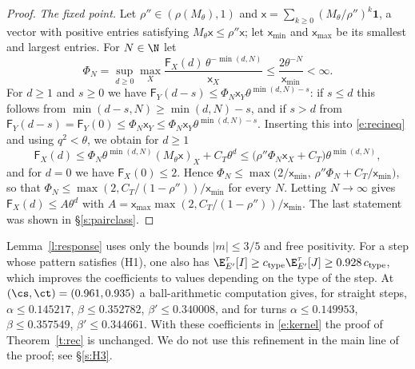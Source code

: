 \begin{proof}
\emph{The fixed point.} Let $\rho'' \in (\rho(M_\theta), 1)$ and $\mathsf x = \sum_{k \ge 0} (M_\theta/\rho'')^k \mathbf 1$, a vector with positive entries satisfying $M_\theta \mathsf x \le \rho'' \mathsf x$; let $\mathsf x_{\min}$ and $\mathsf x_{\max}$ be its smallest and largest entries. For $N \in \N$ let
\begin{equation*}
\Phi_N = \sup_{d \ge 0} \max_{X} \frac{\mathsf F_X(d) \, \theta^{-\min(d, N)}}{\mathsf x_X} \le \frac{2 \theta^{-N}}{\mathsf x_{\min}} < \infty .
\end{equation*}
For $d \ge 1$ and $s \ge 0$ we have $\mathsf F_Y(d - s) \le \Phi_N \mathsf x_Y \theta^{\min(d, N) - s}$: if $s \le d$ this follows from $\min(d - s, N) \ge \min(d, N) - s$, and if $s > d$ from $\mathsf F_Y(d - s) = \mathsf F_Y(0) \le \Phi_N \mathsf x_Y \le \Phi_N \mathsf x_Y \theta^{\min(d, N) - s}$. Inserting this into \eqref{e:recineq} and using $q^2 < \theta$, we obtain for $d \ge 1$
\begin{equation*}
\mathsf F_X(d) \le \Phi_N \theta^{\min(d, N)} (M_\theta \mathsf x)_X + C_T \theta^{d} \le \bigl( \rho'' \Phi_N \mathsf x_X + C_T \bigr) \theta^{\min(d, N)} ,
\end{equation*}
and for $d = 0$ we have $\mathsf F_X(0) \le 2$. Hence $\Phi_N \le \max\bigl( 2/\mathsf x_{\min}, \, \rho'' \Phi_N + C_T / \mathsf x_{\min} \bigr)$, so that $\Phi_N \le \max(2, C_T/(1 - \rho''))/\mathsf x_{\min}$ for every $N$. Letting $N \to \infty$ gives $\mathsf F_X(d) \le A \theta^d$ with $A = \mathsf x_{\max} \max(2, C_T / (1 - \rho''))/\mathsf x_{\min}$. The last statement was shown in \S\ref{s:pairclass}.
\end{proof}

\begin{remark}\label{r:typedep}
Lemma~\ref{l:response} uses only the bounds $|m| \le 3/5$ and free positivity. For a step whose pattern satisfies (H1), one also has $\E^\tau_{E'}[I] \ge c_{\mathrm{type}} \E^\tau_{E'}[J] \ge 0.928 \, c_{\mathrm{type}}$, which improves the coefficients to values depending on the type of the step. At $(\cs, \ct) = (0.961, 0.935)$ a ball-arithmetic computation gives, for straight steps, $\alpha \le 0.145217$, $\beta \le 0.352782$, $\beta' \le 0.340008$, and for turns $\alpha \le 0.149953$, $\beta \le 0.357549$, $\beta' \le 0.344661$. With these coefficients in \eqref{e:kernel} the proof of Theorem~\ref{t:rec} is unchanged. We do not use this refinement in the main line of the proof; see \S\ref{s:H3}.
\end{remark}
